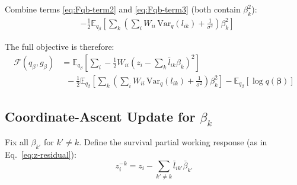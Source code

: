 \documentclass[11pt]{article}
\newcommand{\lbar}[2]{\bar{l}_{#1#2}}
\newcommand{\betabar}[1]{\bar{\beta}_{#1}}
\begin{document}
\begin{derivbox}
Combine terms \eqref{eq:Fqb-term2} and \eqref{eq:Fqb-term3} (both contain
$\beta_k^2$):
\begin{align}
  &-\frac{1}{2}\mathbb{E}_{q_\beta}\!\left[
    \sum_k\left(\sum_i W_{ii}\,\mathrm{Var}_q(l_{ik}) + \frac{1}{\sigma^2}\right)\beta_k^2
  \right] \label{eq:Fqb-combine}
\end{align}

The full objective is therefore:
\begin{align}
  \mathcal{F}(q_\beta, g_\beta)
  &= \mathbb{E}_{q_\beta}\!\left[
     \sum_i -\frac{1}{2}W_{ii}\left(z_i - \sum_k\lbar{i}{k}\beta_k\right)^2
  \right] \nonumber\\
  &\;\; -\frac{1}{2}\mathbb{E}_{q_\beta}\!\left[
     \sum_k\left(\sum_i W_{ii}\,\mathrm{Var}_q(l_{ik}) + \frac{1}{\sigma^2}\right)\beta_k^2
  \right]
  - \mathbb{E}_{q_\beta}\!\left[\log q(\bm{\beta})\right]
  \label{eq:Fqb-full}
\end{align}
\end{derivbox}

\subsection{Coordinate-Ascent Update for $\beta_k$}

Fix all $\beta_{k'}$ for $k' \neq k$.  Define the survival partial working
response (as in Eq.~\eqref{eq:z-residual}):
\begin{equation}
  z^{-k}_i = z_i - \sum_{k'\neq k}\lbar{i}{k'}\betabar{k'}
\end{equation}
\end{document}
